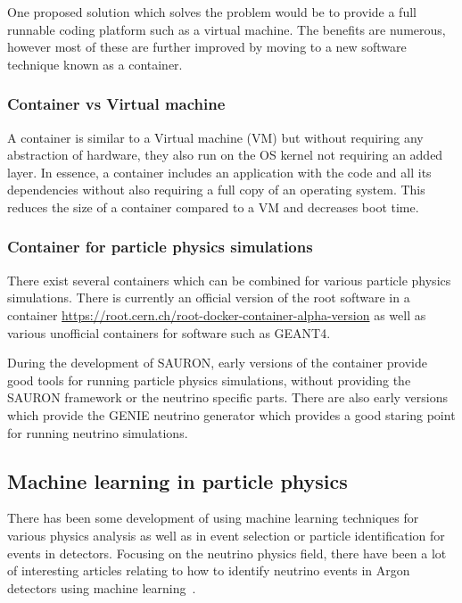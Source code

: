 One proposed solution which solves the problem would be to provide a full runnable coding platform such as a virtual machine. The benefits are numerous, however most of these are further improved by moving to a new software technique known as a container.

\subsubsection{Container vs Virtual machine}

A container is similar to a Virtual machine (VM) but without requiring any abstraction of hardware, they also run on the OS kernel not requiring an added layer. In essence, a container includes an application with the code and all its dependencies without also requiring a full copy of an operating system. This reduces the size of a container compared to a VM and decreases boot time.

\subsubsection{Container for particle physics simulations}
There exist several containers which can be combined for various particle physics simulations. There is currently an official version of the root software in a container \url{https://root.cern.ch/root-docker-container-alpha-version} as well as various unofficial containers for software such as GEANT4.

During the development of SAURON, early versions of the container provide good tools for running particle physics simulations, without providing the SAURON framework or the neutrino specific parts. There are also early versions which provide the GENIE neutrino generator which provides a good staring point for running neutrino simulations.

\subsection{Machine learning in particle physics}

There has been some development of using machine learning techniques for various physics analysis as well as in event selection or particle identification for events in detectors. Focusing on the neutrino physics field, there have been a lot of interesting articles relating to how to identify neutrino events in Argon detectors using machine learning~\cite{83Radovic2018, 84Adams}. 

